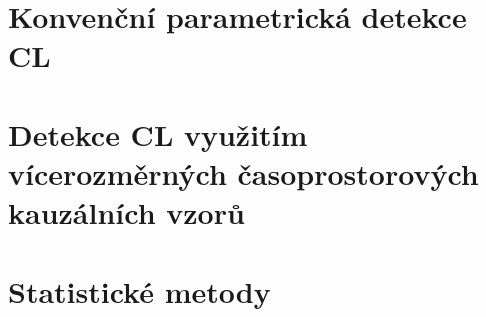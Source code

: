 \section{Konvenční parametrická detekce CL}
\label{sec:kovencni_detekce}


\section{Detekce CL využitím vícerozměrných časoprostorových kauzálních vzorů}
\label{sec:hybridni_detekce}


\section{Statistické metody}
\label{sec:statisticke_metody}


% 

% 

% 

